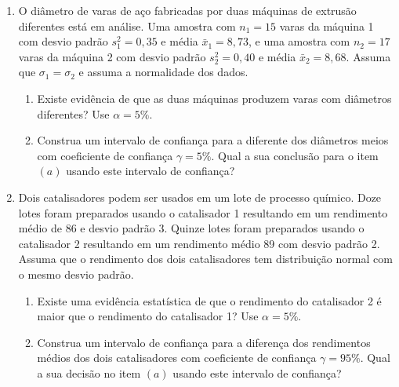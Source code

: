 \documentclass[8pt, a4paper]{article}
\begin{document}
\begin{enumerate}
	\item O diâmetro de varas de aço fabricadas por duas máquinas de extrusão diferentes está em análise. Uma amostra com $n_1 = 15$ varas da máquina 1 com desvio padrão $s_1^2 = 0,35$ e média $\bar{x}_1 = 8,73$, e uma amostra com $n_2=17$ varas da máquina 2 com desvio  padrão $s_2^2 = 0,40$ e média $\bar{x}_2=8,68$. Assuma que $\sigma_1=\sigma_2$ e assuma a normalidade dos dados. 
	\begin{enumerate}
		\item Existe evidência de que as duas máquinas produzem varas com diâmetros diferentes? Use $\alpha=5\%$.
		\item Construa um intervalo de confiança para a diferente dos diâmetros meios com coeficiente de confiança $\gamma =5\%$. Qual a sua conclusão para o item $(a)$ usando este intervalo de confiança?
	\end{enumerate}

	\item Dois catalisadores podem ser usados em um lote de processo químico. Doze lotes foram preparados usando o catalisador 1 resultando em um rendimento médio de 86 e desvio padrão 3. Quinze lotes foram preparados usando o catalisador 2 resultando em um rendimento médio 89 com desvio padrão 2. Assuma que o rendimento dos dois catalisadores tem distribuição normal com o mesmo desvio padrão. 
	\begin{enumerate}
		\item Existe uma evidência estatística de que o rendimento do catalisador 2 é maior que o rendimento do catalisador 1? Use $\alpha = 5\%$.
		\item Construa um intervalo de confiança para a diferença dos rendimentos médios dos dois catalisadores com coeficiente de confiança $\gamma = 95\%$. Qual a sua decisão no item $(a)$ usando este intervalo de confiança?
	\end{enumerate}


\end{enumerate}
\end{document}
